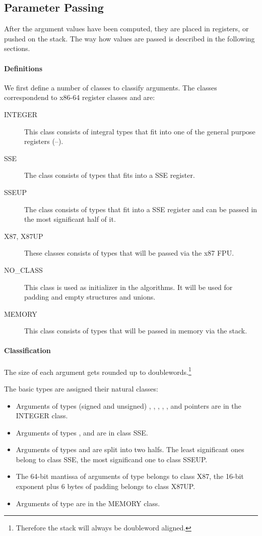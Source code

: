 \subsection{Parameter Passing}

After the argument values have been computed, they are placed in
registers, or pushed on the stack.  The way how values are passed is
described in the following sections.

\paragraph{Definitions}
We first define a number of classes to classify arguments.  The
classes correspondend to x86-64 register classes and are:

\begin{description}
\item[INTEGER] This class consists of integral types that fit into one of
  the general purpose registers (\RAX--).
\item[SSE] The class consists of types that fits into a SSE register.
\item[SSEUP] The class consists of types that fit into a SSE register and
  can be passed in the most significant half of it.
\item[X87, X87UP] These classes consists of types that will be passed via
  the x87 FPU.
\item[NO\_CLASS] This class is used as initializer in the algorithms.  It
  will be used for padding and empty structures and unions.
\item[MEMORY] This class consists of types that will be passed in memory
  via the stack.
\end{description}


\paragraph{Classification}
The size of each argument gets rounded up to
doublewords.\footnote{Therefore the stack will always be doubleword aligned.}

The basic types are assigned their natural classes:
\begin{itemize}
\item Arguments of types (signed and unsigned) ,
  , , , , and
  pointers are in the INTEGER class.
\item Arguments of types ,  and 
  are in class SSE.
\item Arguments of types  and  are split
  into two halfs.  The least significant ones belong to class SSE, the
  most significand one to class SSEUP.
\item The 64-bit mantissa of arguments of type 
  belongs to class X87, the 16-bit exponent plus 6 bytes of padding
  belongs to class X87UP.
\item Arguments of type  are in the MEMORY class.
\end{itemize}


